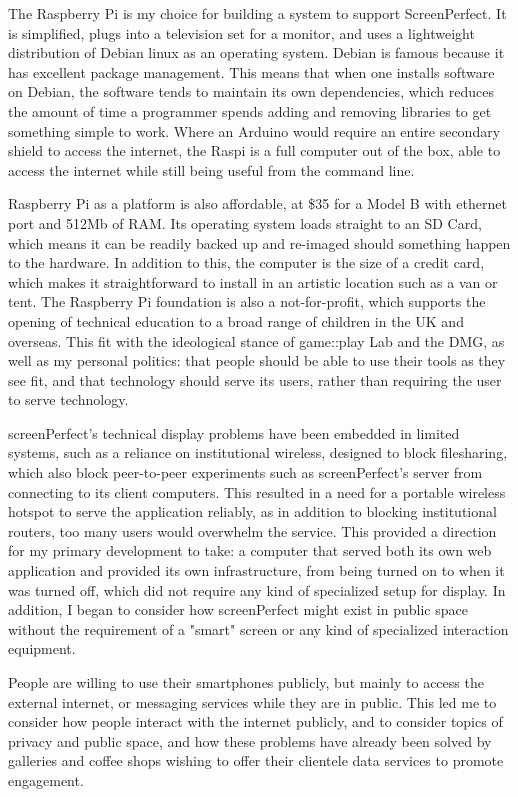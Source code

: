 The Raspberry Pi is my choice for building a system to support ScreenPerfect. It is simplified, plugs into a television set for a monitor, and uses a lightweight distribution of Debian linux as an operating system. Debian is famous because it has excellent package management. This means that when one installs software on Debian, the software tends to maintain its own dependencies, which reduces the amount of time a programmer spends adding and removing libraries to get something simple to work. Where an Arduino would require an entire secondary shield to access the internet, the Raspi is a full computer out of the box, able to access the internet while still being useful from the command line.

Raspberry Pi as a platform is also affordable, at \$35 for a Model B with ethernet port and 512Mb of RAM. Its operating system loads straight to an SD Card, which means it can be readily backed up and re-imaged should something happen to the hardware. In addition to this, the computer is the size of a credit card, which makes it straightforward to install in an artistic location such as a van or tent. The Raspberry Pi foundation is also a not-for-profit, which supports the opening of technical education to a broad range of children in the UK and overseas. This fit with the ideological stance of game::play Lab and the DMG, as well as my personal politics: that people should be able to use their tools as they see fit, and that technology should serve its users, rather than requiring the user to serve technology.

screenPerfect's technical display problems have been embedded in limited systems, such as a reliance on institutional wireless, designed to block filesharing, which also block peer-to-peer experiments such as screenPerfect's server from connecting to its client computers. This resulted in a need for a portable wireless hotspot to serve the application reliably, as in addition to blocking institutional routers, too many users would overwhelm the service. This provided a direction for my primary development to take: a computer that served both its own web application and provided its own infrastructure, from being turned on to when it was turned off, which did not require any kind of specialized setup for display. In addition, I began to consider how screenPerfect might exist in public space without the requirement of a "smart" screen or any kind of specialized interaction equipment.

People are willing to use their smartphones publicly, but mainly to access the external internet, or messaging services while they are in public. This led me to consider how people interact with the internet publicly, and to consider topics of privacy and public space, and how these problems have already been solved by galleries and coffee shops wishing to offer their clientele data services to promote engagement.

